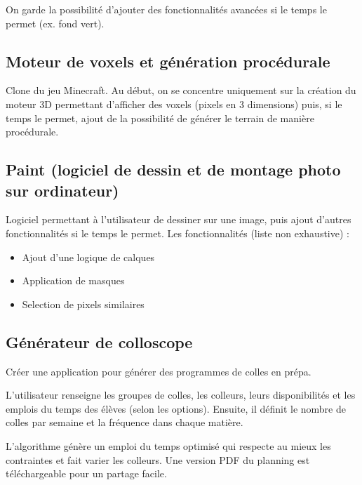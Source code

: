 \documentclass{rapport}
\begin{document}
On garde la possibilité d'ajouter des fonctionnalités avancées si le temps le permet (ex. fond vert).

\hypertarget{moteur-de-voxels-et-guxe9nuxe9ration-procuxe9durale}{%
\subsection{Moteur de voxels et génération procédurale}\label{moteur-de-voxels-et-guxe9nuxe9ration-procuxe9durale}}

Clone du jeu Minecraft. Au début, on se concentre uniquement sur la
création du moteur 3D permettant d'afficher des voxels (pixels en 3
dimensions) puis, si le temps le permet, ajout de la possibilité de
générer le terrain de manière procédurale.

\hypertarget{paint-logiciel-de-dessin-et-de-montage-photo-sur-ordinateur}{%
\subsection{Paint (logiciel de dessin et de montage photo sur
ordinateur)}\label{paint-logiciel-de-dessin-et-de-montage-photo-sur-ordinateur}}

Logiciel permettant à l'utilisateur de dessiner sur une image, puis ajout d'autres fonctionnalités si le temps le permet. Les fonctionnalités (liste non exhaustive) : 
\begin{itemize}
    \item Ajout d'une logique de calques
    \item Application de masques
    \item Selection de pixels similaires
\end{itemize}

\hypertarget{guxe9nuxe9rateur-de-colloscope}{%
\subsection{Générateur de colloscope}\label{guxe9nuxe9rateur-de-colloscope}}

Créer une application pour générer des programmes de colles en prépa.

L'utilisateur renseigne les groupes de colles, les colleurs, leurs
disponibilités et les emplois du temps des élèves (selon les options).
Ensuite, il définit le nombre de colles par semaine et la fréquence dans
chaque matière.

L'algorithme génère un emploi du temps optimisé qui respecte au mieux
les contraintes et fait varier les colleurs. Une version PDF du planning
est téléchargeable pour un partage facile.
\end{document}
